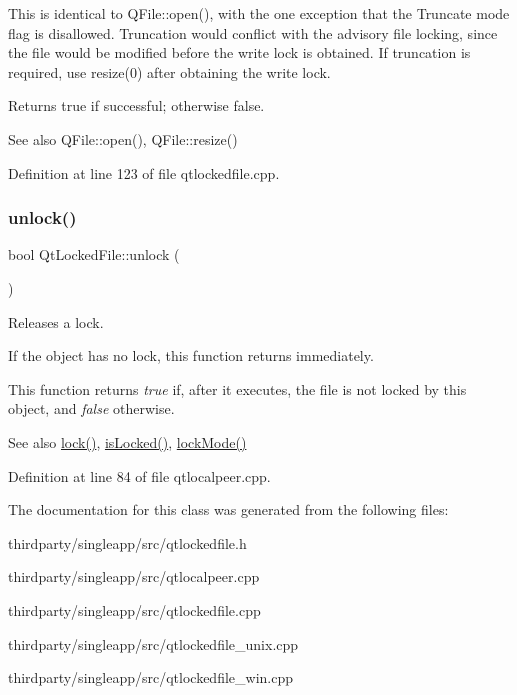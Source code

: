 This is identical to Q\+File\+::open(), with the one exception that the Truncate mode flag is disallowed. Truncation would conflict with the advisory file locking, since the file would be modified before the write lock is obtained. If truncation is required, use resize(0) after obtaining the write lock.

Returns true if successful; otherwise false.

\begin{DoxySeeAlso}{See also}
Q\+File\+::open(), Q\+File\+::resize() 
\end{DoxySeeAlso}


Definition at line 123 of file qtlockedfile.\+cpp.

\mbox{\label{class_qt_l_p___private_1_1_qt_locked_file_abb4d7e6211d9e6e14afaa661818fb2bf}} 
\subsubsection{\texorpdfstring{unlock()}{unlock()}}
{\footnotesize\ttfamily bool Qt\+Locked\+File\+::unlock (\begin{DoxyParamCaption}{ }\end{DoxyParamCaption})}

Releases a lock.

If the object has no lock, this function returns immediately.

This function returns {\itshape true} if, after it executes, the file is not locked by this object, and {\itshape false} otherwise.

\begin{DoxySeeAlso}{See also}
\hyperlink{class_qt_l_p___private_1_1_qt_locked_file_af7876c08254a16d00022939f2fb9a8b8}{lock()}, \hyperlink{class_qt_l_p___private_1_1_qt_locked_file_a0800b8ae9f4d268fe6968b9075f64bb3}{is\+Locked()}, \hyperlink{class_qt_l_p___private_1_1_qt_locked_file_a0ae096d85cb722b1563521ad2b6dbde2}{lock\+Mode()} 
\end{DoxySeeAlso}


Definition at line 84 of file qtlocalpeer.\+cpp.



The documentation for this class was generated from the following files\+:\begin{DoxyCompactItemize}
\item 
thirdparty/singleapp/src/qtlockedfile.\+h\item 
thirdparty/singleapp/src/qtlocalpeer.\+cpp\item 
thirdparty/singleapp/src/qtlockedfile.\+cpp\item 
thirdparty/singleapp/src/qtlockedfile\+\_\+unix.\+cpp\item 
thirdparty/singleapp/src/qtlockedfile\+\_\+win.\+cpp\end{DoxyCompactItemize}
